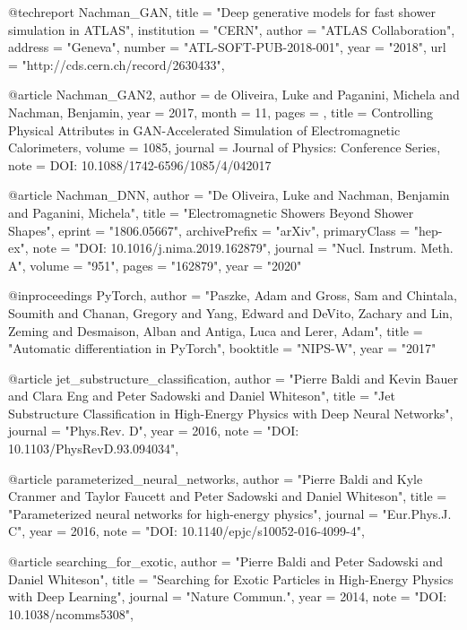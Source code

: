 @techreport{
    Nachman_GAN,
    title   = "Deep generative models for fast shower simulation in ATLAS",
    institution = "CERN",
    author  = "ATLAS Collaboration",
    address = "Geneva",
    number  = "ATL-SOFT-PUB-2018-001",
    year    = "2018",
    url     = "http://cds.cern.ch/record/2630433",
}

@article{
	Nachman_GAN2,
    author  = {de Oliveira, Luke and Paganini, Michela and Nachman, Benjamin},
    year    = {2017},
    month   = {11},
    pages   = {},
    title   = {Controlling Physical Attributes in GAN-Accelerated Simulation of Electromagnetic Calorimeters},
    volume  = {1085},
    journal = {Journal of Physics: Conference Series},
    note    = {DOI: 10.1088/1742-6596/1085/4/042017}
}

@article{
	Nachman_DNN,
    author  = "De Oliveira, Luke and Nachman, Benjamin and Paganini, Michela",
    title   = "{Electromagnetic Showers Beyond Shower Shapes}",
    eprint  = "1806.05667",
    archivePrefix   = "arXiv",
    primaryClass    = "hep-ex",
    note    = "DOI: 10.1016/j.nima.2019.162879",
    journal = "Nucl. Instrum. Meth. A",
    volume  = "951",
    pages   = "162879",
    year    = "2020"
}

@inproceedings{
	PyTorch,
    author  = "Paszke, Adam and Gross, Sam and Chintala, Soumith and Chanan, Gregory and Yang, Edward and DeVito, Zachary and Lin, Zeming and Desmaison, Alban and Antiga, Luca and Lerer, Adam",
    title   = "Automatic differentiation in PyTorch",
    booktitle   = "NIPS-W",
    year    = "2017"
}

@article{
    jet_substructure_classification,
    author  = "Pierre Baldi and Kevin Bauer and Clara Eng and Peter Sadowski and Daniel Whiteson",
    title   = "Jet Substructure Classification in High-Energy Physics with Deep Neural Networks",
    journal = "Phys.Rev. D",
    year    = 2016,
    note    = "DOI: 10.1103/PhysRevD.93.094034",
}

@article{
    parameterized_neural_networks,
    author  = "Pierre Baldi and Kyle Cranmer and Taylor Faucett and Peter Sadowski and Daniel Whiteson",
    title   = "Parameterized neural networks for high-energy physics",
    journal = "Eur.Phys.J. C",
    year    = 2016,
    note    = "DOI: 10.1140/epjc/s10052-016-4099-4",
}

@article{
    searching_for_exotic,
    author  = "Pierre Baldi and Peter Sadowski and Daniel Whiteson",
    title   = "Searching for Exotic Particles in High-Energy Physics with Deep Learning",
    journal = "Nature Commun.",
    year    = 2014,
    note    = "DOI: 10.1038/ncomms5308",
}

